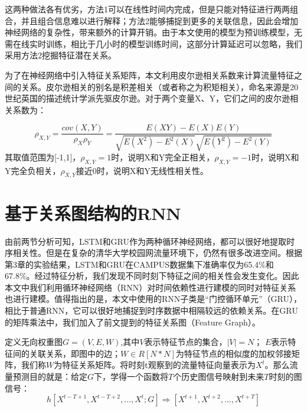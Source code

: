 这两种做法各有优劣，方法1可以在线性时间内完成，但是只能对特征进行两两组合，并且组合信息难以进行解释；方法2能够捕捉到更多的关联信息，因此会增加神经网络的复杂性，带来额外的计算开销。由于本文使用的模型为预训练模型，无需在线实时训练，相比于几小时的模型训练时间，这部分计算延迟可以忽略，我们采用方法2挖掘特征潜在关系。

为了在神经网络中引入特征关系矩阵，本文利用皮尔逊相关系数来计算流量特征之间的关系。皮尔逊相关的别名是积差相关（或者称之为积矩相关），命名来源是20 世纪英国的描述统计学派先驱皮尔逊。对于两个变量X、Y，它们之间的皮尔逊相关系数为：


\begin{equation}
  \rho_{X,Y} = \frac{cov(X,Y)}{\rho_X\rho_Y}=\frac{E(XY)-E(X)E(Y)}{\sqrt{E(X^2)-E^2(X)}\sqrt{E(Y^2)-E^2(Y)}}
\end{equation}
其取值范围为[-1,1]，$\rho_{X,Y}=1$时，说明X和Y完全正相关，$\rho_{X,Y}=-1$时，说明X和Y完全负相关，$\rho_{X,Y}$接近0时，说明X和Y无线性相关性。





\section{基于关系图结构的RNN}
由前两节分析可知，LSTM和GRU作为两种循环神经网络，都可以很好地提取时序相关性。但是在复杂的清华大学校园网流量环境下，仍然有很多改进空间。根据第3章的实验结果，LSTM和GRU在CAMPUS数据集下准确率仅为65.4\%和67.8\%。经过特征分析，我们发现不同时刻下特征之间的相关性会发生变化。因此本文中我们利用循环神经网络（RNN）对时间依赖性进行建模的同时对特征关系也进行建模。值得指出的是，本文中使用的RNN子类是“门控循环单元”（GRU），相比于普通RNN，它可以很好地捕捉到时序数据中相隔较远的依赖关系\cite{li2017diffusion}。在GRU的矩阵乘法中，我们加入了前文提到的特征关系图（Feature Graph）。

定义无向权重图$G=(V,E,W)$,其中$V$表示特征节点的集合，$|V|=N$； $E$表示特征间的关联关系，即图中的边；$W \in R[N*N]$为特征节点的相似度的加权邻接矩阵，我们称$W$为特征关系矩阵。将时刻t观察到的流量特征向量表示为$X^t$。那么流量预测目的就是：给定$G$下，学得一个函数将$T$个历史图信号映射到未来$T$时刻的图信号：
\begin{equation}
    h[X^{t-T+1}, X^{t-T+2},...,X^{t}; G] \Rightarrow [X^{t+1}, X^{t+2}, ..., X^{t+T}]
\end{equation}


